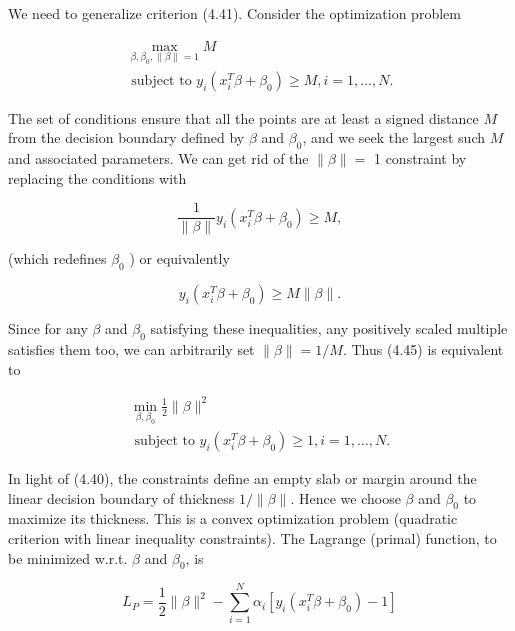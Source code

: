 \documentclass[10pt]{article}
\begin{document}
We need to generalize criterion (4.41). Consider the optimization problem


\begin{gather*}
\max _{\beta, \beta_{0},\|\beta\|=1} M  \tag{4.45}\\
\text { subject to } y_{i}\left(x_{i}^{T} \beta+\beta_{0}\right) \geq M, i=1, \ldots, N .
\end{gather*}


The set of conditions ensure that all the points are at least a signed distance $M$ from the decision boundary defined by $\beta$ and $\beta_{0}$, and we seek the largest such $M$ and associated parameters. We can get rid of the $\|\beta\|=$ 1 constraint by replacing the conditions with


\begin{equation*}
\frac{1}{\|\beta\|} y_{i}\left(x_{i}^{T} \beta+\beta_{0}\right) \geq M, \tag{4.46}
\end{equation*}


(which redefines $\beta_{0}$ ) or equivalently


\begin{equation*}
y_{i}\left(x_{i}^{T} \beta+\beta_{0}\right) \geq M\|\beta\| . \tag{4.47}
\end{equation*}


Since for any $\beta$ and $\beta_{0}$ satisfying these inequalities, any positively scaled multiple satisfies them too, we can arbitrarily set $\|\beta\|=1 / M$. Thus (4.45) is equivalent to


\begin{gather*}
\min _{\beta, \beta_{0}} \frac{1}{2}\|\beta\|^{2}  \tag{4.48}\\
\text { subject to } y_{i}\left(x_{i}^{T} \beta+\beta_{0}\right) \geq 1, i=1, \ldots, N .
\end{gather*}


In light of (4.40), the constraints define an empty slab or margin around the linear decision boundary of thickness $1 /\|\beta\|$. Hence we choose $\beta$ and $\beta_{0}$ to maximize its thickness. This is a convex optimization problem (quadratic\\
criterion with linear inequality constraints). The Lagrange (primal) function, to be minimized w.r.t. $\beta$ and $\beta_{0}$, is


\begin{equation*}
L_{P}=\frac{1}{2}\|\beta\|^{2}-\sum_{i=1}^{N} \alpha_{i}\left[y_{i}\left(x_{i}^{T} \beta+\beta_{0}\right)-1\right] \tag{4.49}
\end{equation*}
\end{document}
